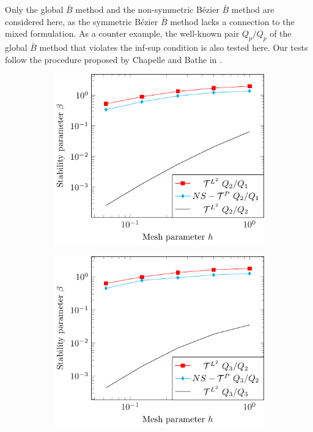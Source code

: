 \documentclass{article}
\newcommand{\Bezier}{{B\'{e}zier} }
\begin{document}
Only the global $\bar{B}$ method and the non-symmetric \Bezier $\bar{B}$ method are considered here, as the symmetric \Bezier $\bar{B}$ method lacks a connection to the mixed formulation. As a counter example, the well-known pair $Q_p/Q_p$ of the global $\bar{B}$ method that violates the inf-sup condition is also tested here. Our tests follow the procedure proposed by Chapelle and Bathe in \cite{chapelle_inf-sup_1993}.\par
\begin{figure}[htb!]
    \centering
    \begin{subfigure}[b]{0.31\linewidth}        %
        \centering
        \includegraphics[width=\linewidth]{beta_p_2}
    \end{subfigure}
    \begin{subfigure}[b]{0.31\linewidth}        %
        \centering
        \includegraphics[width=\linewidth]{beta_p_3}

\end{subfigure}
\end{figure}
\end{document}
